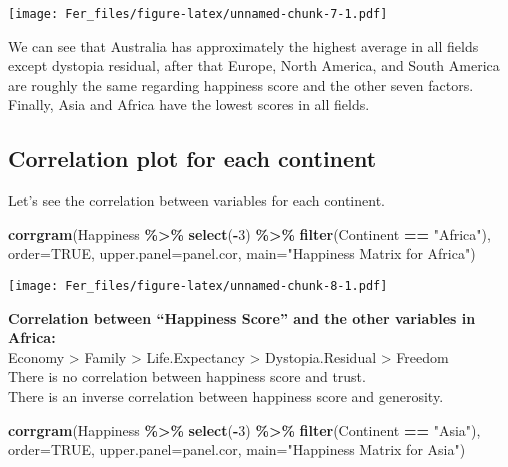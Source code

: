 \documentclass[
]{article}
\newenvironment{Shaded}{\begin{snugshade}}{\end{snugshade}}
\newcommand{\AttributeTok}[1]{\textcolor[rgb]{0.13,0.29,0.53}{#1}}
\newcommand{\ConstantTok}[1]{\textcolor[rgb]{0.56,0.35,0.01}{#1}}
\newcommand{\DecValTok}[1]{\textcolor[rgb]{0.00,0.00,0.81}{#1}}
\newcommand{\FunctionTok}[1]{\textcolor[rgb]{0.13,0.29,0.53}{\textbf{#1}}}
\newcommand{\NormalTok}[1]{#1}
\newcommand{\SpecialCharTok}[1]{\textcolor[rgb]{0.81,0.36,0.00}{\textbf{#1}}}
\newcommand{\StringTok}[1]{\textcolor[rgb]{0.31,0.60,0.02}{#1}}
\begin{document}
\texttt{[image: Fer\_files/figure-latex/unnamed-chunk-7-1.pdf]}

We can see that Australia has approximately the highest average in all
fields except dystopia residual, after that Europe, North America, and
South America are roughly the same regarding happiness score and the
other seven factors. Finally, Asia and Africa have the lowest scores in
all fields.

\subsection{Correlation plot for each
continent}\label{correlation-plot-for-each-continent}

Let's see the correlation between variables for each continent.

\begin{Shaded}
\begin{Highlighting}[]
\FunctionTok{corrgram}\NormalTok{(Happiness }\SpecialCharTok{\%\textgreater{}\%} \FunctionTok{select}\NormalTok{(}\SpecialCharTok{{-}}\DecValTok{3}\NormalTok{) }\SpecialCharTok{\%\textgreater{}\%} \FunctionTok{filter}\NormalTok{(Continent }\SpecialCharTok{==} \StringTok{"Africa"}\NormalTok{), }\AttributeTok{order=}\ConstantTok{TRUE}\NormalTok{,}
         \AttributeTok{upper.panel=}\NormalTok{panel.cor, }\AttributeTok{main=}\StringTok{"Happiness Matrix for Africa"}\NormalTok{)}
\end{Highlighting}
\end{Shaded}

\texttt{[image: Fer\_files/figure-latex/unnamed-chunk-8-1.pdf]}

\textbf{Correlation between ``Happiness Score'' and the other variables
in Africa:}\\
Economy \textgreater{} Family \textgreater{} Life.Expectancy
\textgreater{} Dystopia.Residual \textgreater{} Freedom\\
There is no correlation between happiness score and trust.\\
There is an inverse correlation between happiness score and generosity.

\begin{Shaded}
\begin{Highlighting}[]
\FunctionTok{corrgram}\NormalTok{(Happiness }\SpecialCharTok{\%\textgreater{}\%} \FunctionTok{select}\NormalTok{(}\SpecialCharTok{{-}}\DecValTok{3}\NormalTok{) }\SpecialCharTok{\%\textgreater{}\%} \FunctionTok{filter}\NormalTok{(Continent }\SpecialCharTok{==} \StringTok{"Asia"}\NormalTok{), }\AttributeTok{order=}\ConstantTok{TRUE}\NormalTok{,}
         \AttributeTok{upper.panel=}\NormalTok{panel.cor, }\AttributeTok{main=}\StringTok{"Happiness Matrix for Asia"}\NormalTok{)}
\end{Highlighting}
\end{Shaded}
\end{document}

